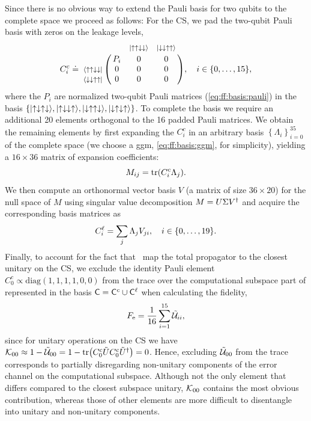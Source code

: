 Since there is no obvious way to extend the Pauli basis for two qubits to the complete space we proceed as follows: For the CS, we pad the two-qubit Pauli basis with zeros on the leakage levels, \ie
\begin{equation}\label{eq:ff:basis:cnot}
    C_i^c\doteq\bordermatrix{~                       &     & \footnotesize{\ketuudd} & \footnotesize{\ketdduu} \cr
                                                     & P_i & 0                       & 0                       \cr
                             \footnotesize{\brauudd} & 0   & 0                       & 0                       \cr
                             \footnotesize{\bradduu} & 0   & 0                       & 0                       \cr}
    \qcomma{i\in\{0,\dotsc,15\}},
\end{equation}
where the $P_i$ are normalized two-qubit Pauli matrices (\cf \cref{eq:ff:basis:pauli}) in the basis $\lbrace\mbox{\ensuremath{\ket{\uparrow\downarrow\uparrow\downarrow}}},\mbox{\ensuremath{\ket{\uparrow\downarrow\downarrow\uparrow}}},\mbox{\ensuremath{\ket{\downarrow\uparrow\uparrow\downarrow}}},\mbox{\ensuremath{\ket{\downarrow\uparrow\downarrow\uparrow}}}\rbrace$.
To complete the basis we require an additional 20 elements orthogonal to the 16 padded Pauli matrices.
We obtain the remaining elements by first expanding the $C_i^c$ in an arbitrary basis $\left\lbrace\Lambda_i\right\rbrace_{i=0}^{35}$ of the complete space (we choose a \gls{ggm}, \cf \cref{eq:ff:basis:ggm}, for simplicity), yielding a $16\times 36$ matrix of expansion coefficients:
\begin{equation}
    M_{ij} = \tr(C_i^c\Lambda_j).
\end{equation}
We then compute an orthonormal vector basis $V$ (a matrix of size $36\times 20$) for the null space of $M$ using singular value decomposition $M = U\Sigma V^\dagger$ and acquire the corresponding basis matrices as
\begin{equation}
    C_i^\ell = \sum_j\Lambda_j V_{ji}\qcomma{i\in\lbrace 0,\dotsc,19\rbrace}.
\end{equation}
Finally, to account for the fact that~ map the total propagator to the closest unitary on the CS, we exclude the identity Pauli element $C_0^c\propto\text{diag}(1, 1, 1, 1, 0, 0)$ from the trace over the computational subspace part of \liouvUe represented in the basis $\mathsf{C} = \mathsf{C}^c\cup\mathsf{C}^\ell$ when calculating the fidelity,
\begin{equation}
    F_{\mathrm{e}} = \frac{1}{16}\sum_{i=1}^{15}\mathcal{\tilde{U}}_{ii},
\end{equation}
since for unitary operations on the CS we have $\mathcal{K}_{00} \approx 1 - \mathcal{\tilde{U}}_{00} = 1 - \mathrm{tr}\bigl(C_0^c\tilde{U} C_0^c\tilde{U}^\dagger\bigr) = 0$.
Hence, excluding $\mathcal{\tilde{U}}_{00}$ from the trace corresponds to partially disregarding non-unitary components of the error channel on the computational subspace.
Although not the only element that differs compared to the closest subspace unitary, $\mathcal{K}_{00}$ contains the most obvious contribution, whereas those of other elements are more difficult to disentangle into unitary and non-unitary components.

